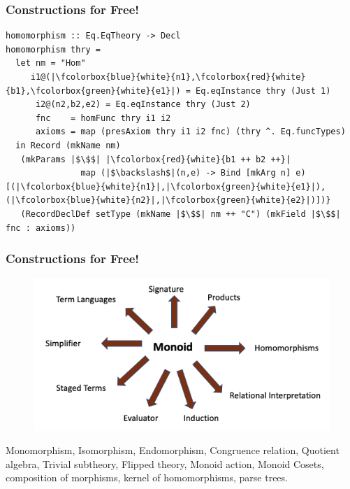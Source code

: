 \documentclass[t,10pt,numbers,fleqn,usenames,xcolor=dvipsnames]{beamer}
\begin{document}
\begin{frame}[fragile] 
\frametitle{Constructions for Free!} 


\begin{overprint}
\begin{verbatim} 
homomorphism :: Eq.EqTheory -> Decl
homomorphism thry =
  let nm = "Hom" 
     i1@(|\fcolorbox{blue}{white}{n1},\fcolorbox{red}{white}{b1},\fcolorbox{green}{white}{e1}|) = Eq.eqInstance thry (Just 1)
      i2@(n2,b2,e2) = Eq.eqInstance thry (Just 2)
      fnc    = homFunc thry i1 i2
      axioms = map (presAxiom thry i1 i2 fnc) (thry ^. Eq.funcTypes)  
  in Record (mkName nm)
   (mkParams |$\$$| |\fcolorbox{red}{white}{b1 ++ b2 ++}|
               map (|$\backslash$|(n,e) -> Bind [mkArg n] e) [(|\fcolorbox{blue}{white}{n1}|,|\fcolorbox{green}{white}{e1}|),(|\fcolorbox{blue}{white}{n2}|,|\fcolorbox{green}{white}{e2}|)])}
   (RecordDeclDef setType (mkName |$\$$| nm ++ "C") (mkField |$\$$| fnc : axioms))
\end{verbatim} 
\end{overprint}
\end{frame}

\begin{frame}[fragile] 
\frametitle{Constructions for Free!} 
\begin{figure}
\includegraphics[scale=0.25]{figures/monoid_generation2.png}
\end{figure}
\scriptsize
Monomorphism, Isomorphism, Endomorphism, Congruence relation, Quotient algebra, Trivial subtheory, Flipped theory, Monoid action, Monoid Cosets, composition of morphisms, kernel of homomorphisms, parse trees.  
\end{frame}
\end{document}
